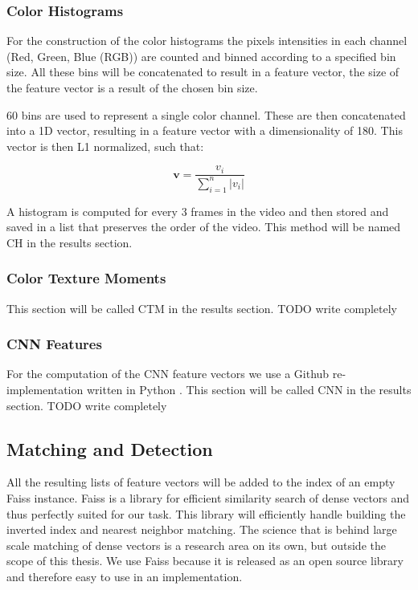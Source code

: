\documentclass{article}
\begin{document}
\subsubsection{Color Histograms}
For the construction of the color histograms the pixels intensities in each channel (Red, Green, Blue (RGB)) are counted and binned according to a specified bin size. All these bins will be concatenated to result in a feature vector, the size of the feature vector is a result of the chosen bin size.

60 bins are used to represent a single color channel. These are then concatenated into a 1D vector, resulting in a feature vector with a dimensionality of 180. This vector is then L1 normalized, such that:

\[\textbf{v} = \frac{v_i}{\sum_{i=1}^{n}|v_i|}\]

A histogram is computed for every 3 frames in the video and then stored and saved in a list that preserves the order of the video. This method will be named CH in the results section.

\subsubsection{Color Texture Moments}
This section will be called CTM in the results section. TODO write completely


\subsubsection{CNN Features}
For the computation of the CNN feature vectors we use a Github re-implementation written in Python \cite{rmac-github}. This section will be called CNN in the results section. TODO write completely


\subsection{Matching and Detection}

All the resulting lists of feature vectors will be added to the index of an empty Faiss instance. Faiss is a library for efficient similarity search of dense vectors \cite{faiss, faiss-github} and thus perfectly suited for our task. This library will efficiently handle building the inverted index and nearest neighbor matching. The science that is behind large scale matching of dense vectors is a research area on its own, but outside the scope of this thesis. We use Faiss because it is released as an open source library and therefore easy to use in an implementation.
\end{document}
